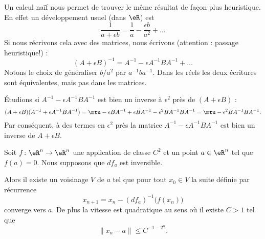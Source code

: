 \begin{remark}
	Un calcul naïf nous permet de trouver le même résultat de façon plus heuristique. En effet un développement usuel (dans \( \eR\)) est
	\begin{equation}
		\frac{1}{ a+\epsilon b }=\frac{1}{ a }-\frac{ \epsilon b }{ a^2 }+\ldots
	\end{equation}
	Si nous récrivons cela avec des matrices, nous écrivons (attention : passage heuristique!) :
	\begin{equation}
		(A+\epsilon B)^{-1}=A^{-1}-\epsilon A^{-1} BA^{-1}+\ldots
	\end{equation}
	Notons le choix de généraliser \( b/a^2\) par \( a^{-1} ba^{-1}\). Dans les réels les deux écritures sont équivalentes, mais pas dans les matrices.

	Étudions si \( A^{-1}-\epsilon A^{-1}BA^{-1}\) est bien un inverse à \( \epsilon^2\) près de \( (A+\epsilon B)\) :
	\begin{equation}
		(A+\epsilon B)(A^{-1}+\epsilon A^{-1} BA^{-1})=\mtu-\epsilon BA^{-1}+\epsilon BA^{-1}-\epsilon^2BA^{-1}BA^{-1}=\mtu-\epsilon^2BA^{-1} BA^{-1}.
	\end{equation}
	Par conséquent, à des termes en \( \epsilon^2\) près la matrice \( A^{-1}-\epsilon A^{-1}BA^{-1}\) est bien un inverse de \( A+\epsilon B\).
\end{remark}

\begin{theorem}\label{ThoHGpGwXk}
	Soit \( f\colon \eR^n\to \eR^n\) une application de classe \( C^2\) et un point \( a\in \eR^n\) tel que \( f(a)=0\). Nous supposons que \( df_a\) est inversible.

	Alors il existe un voisinage \( V\) de \( a\) tel que pour tout \( x_0\in V\) la suite définie par récurrence
	\begin{equation}
		x_{n+1}=x_n-(df_a)^{-1}\big( f(x_n) \big)
	\end{equation}
	converge vers \( a\). De plus la vitesse est quadratique au sens où il existe \( C>1\) tel que
	\begin{equation}        \label{EqtkiDXt}
		\| x_n-a \|\leq C^{-1-2^n}.
	\end{equation}
\end{theorem}

